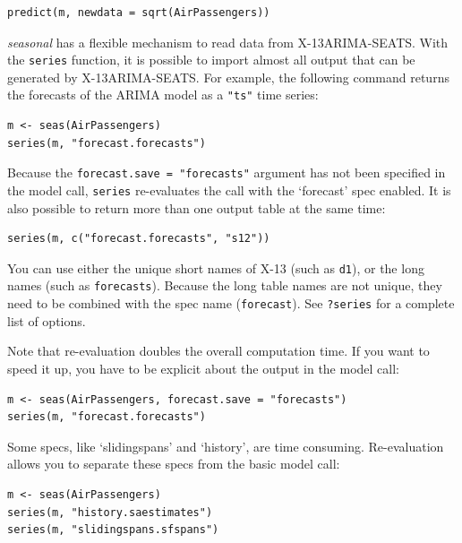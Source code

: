 \begin{verbatim}
predict(m, newdata = sqrt(AirPassengers))
\end{verbatim}


\emph{seasonal} has a flexible mechanism to read data from
X-13ARIMA-SEATS. With the \texttt{series} function, it is possible to
import almost all output that can be generated by X-13ARIMA-SEATS. For
example, the following command returns the forecasts of the ARIMA model
as a \texttt{"ts"} time series:

\begin{verbatim}
m <- seas(AirPassengers)
series(m, "forecast.forecasts")
\end{verbatim}

Because the \texttt{forecast.save = "forecasts"} argument has not been
specified in the model call, \texttt{series} re-evaluates the call with
the `forecast' spec enabled. It is also possible to return more than one
output table at the same time:

\begin{verbatim}
series(m, c("forecast.forecasts", "s12"))
\end{verbatim}

You can use either the unique short names of X-13 (such as \texttt{d1}),
or the long names (such as \texttt{forecasts}). Because the long table
names are not unique, they need to be combined with the spec name
(\texttt{forecast}). See \texttt{?series} for a complete list of
options.

Note that re-evaluation doubles the overall computation time. If you
want to speed it up, you have to be explicit about the output in the
model call:

\begin{verbatim}
m <- seas(AirPassengers, forecast.save = "forecasts")
series(m, "forecast.forecasts")
\end{verbatim}

Some specs, like `slidingspans' and `history', are time consuming.
Re-evaluation allows you to separate these specs from the basic model
call:

\begin{verbatim}
m <- seas(AirPassengers)
series(m, "history.saestimates")
series(m, "slidingspans.sfspans")
\end{verbatim}

